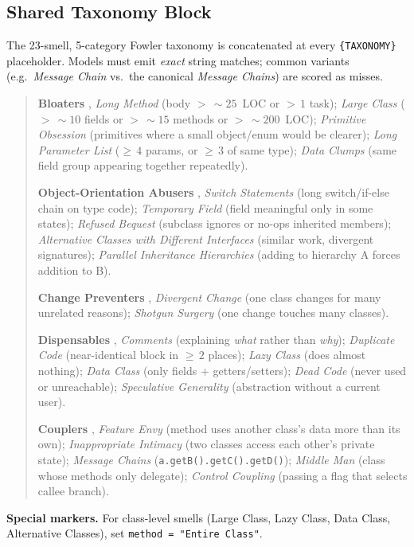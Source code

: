 \documentclass[conference]{IEEEtran}
\begin{document}
\subsection{Shared Taxonomy Block}

\noindent The 23-smell, 5-category Fowler taxonomy is concatenated at every
\texttt{\{TAXONOMY\}} placeholder. Models must emit \emph{exact} string
matches; common variants (e.g.\ \textit{Message Chain} vs.\ the canonical
\textit{Message Chains}) are scored as misses.

\begin{quote}\small
\textbf{Bloaters} ,
\textit{Long Method} (body $>\,{\sim}25$~LOC or $>\,1$ task);
\textit{Large Class} ($>\,{\sim}10$ fields or $>\,{\sim}15$ methods or
$>\,{\sim}200$~LOC);
\textit{Primitive Obsession} (primitives where a small object/enum would
be clearer);
\textit{Long Parameter List} ($\ge\,4$ params, or $\ge\,3$ of same type);
\textit{Data Clumps} (same field group appearing together repeatedly).

\textbf{Object-Orientation Abusers} ,
\textit{Switch Statements} (long switch/if-else chain on type code);
\textit{Temporary Field} (field meaningful only in some states);
\textit{Refused Bequest} (subclass ignores or no-ops inherited members);
\textit{Alternative Classes with Different Interfaces} (similar work,
divergent signatures);
\textit{Parallel Inheritance Hierarchies} (adding to hierarchy A forces
addition to B).

\textbf{Change Preventers} ,
\textit{Divergent Change} (one class changes for many unrelated reasons);
\textit{Shotgun Surgery} (one change touches many classes).

\textbf{Dispensables} ,
\textit{Comments} (explaining \emph{what} rather than \emph{why});
\textit{Duplicate Code} (near-identical block in $\ge\,2$ places);
\textit{Lazy Class} (does almost nothing);
\textit{Data Class} (only fields + getters/setters);
\textit{Dead Code} (never used or unreachable);
\textit{Speculative Generality} (abstraction without a current user).

\textbf{Couplers} ,
\textit{Feature Envy} (method uses another class's data more than its own);
\textit{Inappropriate Intimacy} (two classes access each other's private
state);
\textit{Message Chains} (\texttt{a.getB().getC().getD()});
\textit{Middle Man} (class whose methods only delegate);
\textit{Control Coupling} (passing a flag that selects callee branch).
\end{quote}

\noindent \textbf{Special markers.} For class-level smells (Large Class,
Lazy Class, Data Class, Alternative Classes), set
\texttt{method = "Entire Class"}.
\end{document}
